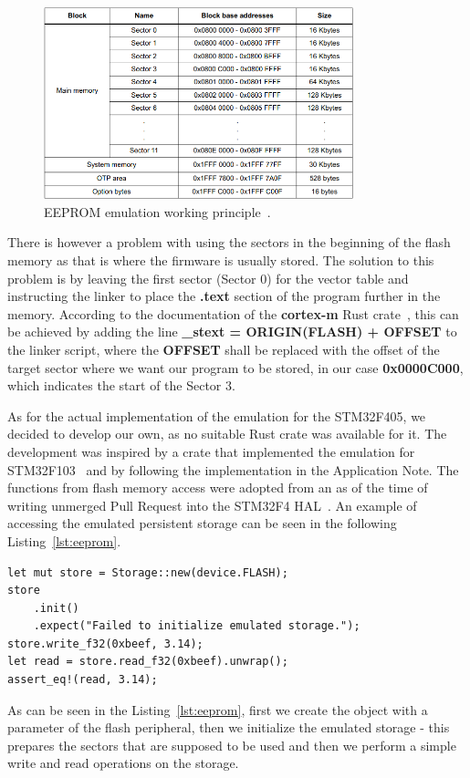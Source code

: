 \begin{figure}[H]
    \centering
    \includegraphics[width=0.8\textwidth]{obrazky/flash_stm}
    \caption{EEPROM emulation working principle~\cite{stmicro_stm32f405rg_nodate}.}
    \label{fig:flash_layout}
\end{figure}

There is however a problem with using the sectors in the beginning of the flash memory as that is where the firmware is usually stored.
The solution to this problem is by leaving the first sector (Sector 0) for the vector table and instructing the linker to place the \textbf{.text} section of the program further in the memory.
According to the documentation of the \textbf{cortex-m} Rust crate~\cite{rust_embedded_wg_rust-embeddedcortex-m-rt_nodate}, this can be achieved by adding the line \textbf{\_stext = ORIGIN(FLASH) + OFFSET} to the linker script, where the \textbf{OFFSET} shall be replaced with the offset of the target sector where we want our program to be stored, in our case \textbf{0x0000C000}, which indicates the start of the Sector 3.

As for the actual implementation of the emulation for the STM32F405, we decided to develop our own, as no suitable Rust crate was available for it.
The development was inspired by a crate that implemented the emulation for STM32F103~\cite{crate_f103_eeprom} and by following the implementation in the Application Note.
The functions from flash memory access were adopted from an as of the time of writing unmerged Pull Request into the STM32F4 HAL~\cite{astro_implement_2020}.
An example of accessing the emulated persistent storage can be seen in the following Listing~\ref{lst:eeprom}.

\begin{lstlisting}[caption={An example use of the emulated persistent storage.},label=lst:eeprom]
let mut store = Storage::new(device.FLASH);
store
    .init()
    .expect("Failed to initialize emulated storage.");
store.write_f32(0xbeef, 3.14);
let read = store.read_f32(0xbeef).unwrap();
assert_eq!(read, 3.14);
\end{lstlisting}

As can be seen in the Listing~\ref{lst:eeprom}, first we create the object with a parameter of the flash peripheral, then we initialize the emulated storage - this prepares the sectors that are supposed to be used and then we perform a simple write and read operations on the storage.
